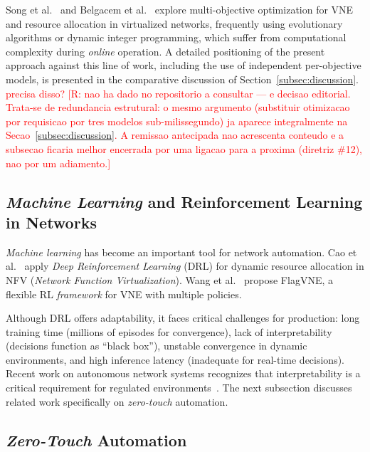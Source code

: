\documentclass[runningheads]{llncs}
\begin{document}
Song et al.~\cite{song2020multiobjective} and Belgacem et al.~\cite{belgacem2016multiobjective} explore multi-objective optimization for VNE and resource allocation in virtualized networks, frequently using evolutionary algorithms or dynamic integer programming, which suffer from computational complexity during \textit{online} operation. A detailed positioning of the present approach against this line of work, including the use of independent per-objective models, is presented in the comparative discussion of Section~\ref{subsec:discussion}. \textcolor{red}{precisa disso?} \textcolor{red}{[R: nao ha dado no repositorio a consultar --- e decisao editorial. Trata-se de redundancia estrutural: o mesmo argumento (substituir otimizacao por requisicao por tres modelos sub-milissegundo) ja aparece integralmente na Secao~\ref{subsec:discussion}. A remissao antecipada nao acrescenta conteudo e a subsecao ficaria melhor encerrada por uma ligacao para a proxima (diretriz \#12), nao por um adiamento.]}

\subsection{\textit{Machine Learning} and Reinforcement Learning in Networks}
\label{subsec:ml-networks}

\textit{Machine learning} has become an important tool for network automation.
Cao et al.~\cite{cao2018nfv-deeprl} apply \textit{Deep Reinforcement Learning} (DRL) for dynamic resource allocation in NFV (\textit{Network Function Virtualization}).
Wang et al.~\cite{ijcai-2024-flagvne} propose FlagVNE, a flexible RL \textit{framework} for VNE with multiple policies.

Although DRL offers adaptability, it faces critical challenges for production: long training time (millions of episodes for convergence), lack of interpretability (decisions function as ``black box''), unstable convergence in dynamic environments, and high inference latency (inadequate for real-time decisions).
Recent work on autonomous network systems recognizes that interpretability is a critical requirement for regulated environments~\cite{white2024zerotough}. The next subsection discusses related work specifically on \textit{zero-touch} automation.

\subsection{\textit{Zero-Touch} Automation}
\label{subsec:zerotouchj}
\end{document}
